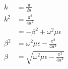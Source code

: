 \documentclass[a4paper,10pt]{bxjsarticle}
\begin{document}
\begin{align*}
    k &= \frac{\pi}{2a} \\
    k^2 &= \frac{\pi^2}{4a^2} \\
        &= -\beta^2 + \omega^2 \mu \epsilon \\
    \beta^2 &= \omega^2 \mu \epsilon - \frac{\pi^2}{4a^2} \\
    \beta &= \sqrt{ \omega^2 \mu \epsilon - \frac{\pi^2}{4a^2} } \\
\end{align*}



  
\end{document}
